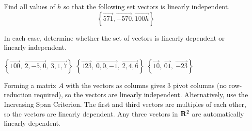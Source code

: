 \begin{problems}
    \problem Find all values of $h$ so that the following set vectors is linearly independent.
    \[\left\{ \vec{5 7 1}, \vec{-5 7 0}, \vec{10 0 h}\right\}\]
    
    \problem %
    In each case, determine whether the set of vectors is linearly
    dependent or linearly independent.
    \begin{subproblems}
      \subproblem
      $\left\{\vec{1 0 0}, \ \vec{2, -5, 0}, \ \vec{3, 1, 7}\right\}$
      \subproblem
      $\left\{\vec{1 2 3}, \ \vec{0, 0, -1}, \ \vec{2, 4, 6}\right\}$
      \subproblem
      $\left\{\vec{1 0}, \ \vec{0 1}, \ \vec{-2 3}\right\}$
    \end{subproblems}

    \begin{solution}
      \begin{subproblems}
        \subproblem Forming a matrix $A$ with the vectors as columns
        gives 3 pivot columns (no row-reduction required), so the
        vectors are linearly independent. Alternatively, use the
        Increasing Span Criterion. %
        \subproblem The first and third vectors are multiples of each
        other, so the vectors are linearly dependent.  %
        \subproblem Any three vectors in ${\bf R}^2$ are automatically
        linearly dependent.
      \end{subproblems}
    \end{solution}
 

\end{problems}
